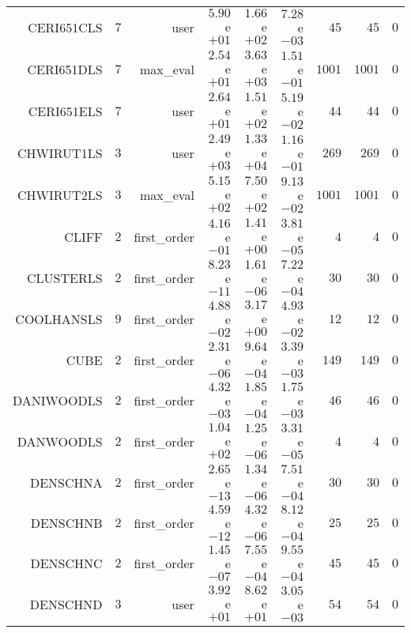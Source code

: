 \begin{longtable}{rrrrrrrrr}
CERI651CLS & \(     7\) & user & \( 5.90\)e\(+01\) & \( 1.66\)e\(+02\) & \( 7.28\)e\(-03\) & \(    45\) & \(    45\) & \(     0\) \\
CERI651DLS & \(     7\) & max\_eval & \( 2.54\)e\(+01\) & \( 3.63\)e\(+03\) & \( 1.51\)e\(-01\) & \(  1001\) & \(  1001\) & \(     0\) \\
CERI651ELS & \(     7\) & user & \( 2.64\)e\(+01\) & \( 1.51\)e\(+02\) & \( 5.19\)e\(-02\) & \(    44\) & \(    44\) & \(     0\) \\
CHWIRUT1LS & \(     3\) & user & \( 2.49\)e\(+03\) & \( 1.33\)e\(+04\) & \( 1.16\)e\(-01\) & \(   269\) & \(   269\) & \(     0\) \\
CHWIRUT2LS & \(     3\) & max\_eval & \( 5.15\)e\(+02\) & \( 7.50\)e\(+02\) & \( 9.13\)e\(-02\) & \(  1001\) & \(  1001\) & \(     0\) \\
CLIFF & \(     2\) & first\_order & \( 4.16\)e\(-01\) & \( 1.41\)e\(+00\) & \( 3.81\)e\(-05\) & \(     4\) & \(     4\) & \(     0\) \\
CLUSTERLS & \(     2\) & first\_order & \( 8.23\)e\(-11\) & \( 1.61\)e\(-06\) & \( 7.22\)e\(-04\) & \(    30\) & \(    30\) & \(     0\) \\
COOLHANSLS & \(     9\) & first\_order & \( 4.88\)e\(-02\) & \( 3.17\)e\(+00\) & \( 4.93\)e\(-02\) & \(    12\) & \(    12\) & \(     0\) \\
CUBE & \(     2\) & first\_order & \( 2.31\)e\(-06\) & \( 9.64\)e\(-04\) & \( 3.39\)e\(-03\) & \(   149\) & \(   149\) & \(     0\) \\
DANIWOODLS & \(     2\) & first\_order & \( 4.32\)e\(-03\) & \( 1.85\)e\(-04\) & \( 1.75\)e\(-03\) & \(    46\) & \(    46\) & \(     0\) \\
DANWOODLS & \(     2\) & first\_order & \( 1.04\)e\(+02\) & \( 1.25\)e\(-06\) & \( 3.31\)e\(-05\) & \(     4\) & \(     4\) & \(     0\) \\
DENSCHNA & \(     2\) & first\_order & \( 2.65\)e\(-13\) & \( 1.34\)e\(-06\) & \( 7.51\)e\(-04\) & \(    30\) & \(    30\) & \(     0\) \\
DENSCHNB & \(     2\) & first\_order & \( 4.59\)e\(-12\) & \( 4.32\)e\(-06\) & \( 8.12\)e\(-04\) & \(    25\) & \(    25\) & \(     0\) \\
DENSCHNC & \(     2\) & first\_order & \( 1.45\)e\(-07\) & \( 7.55\)e\(-04\) & \( 9.55\)e\(-04\) & \(    45\) & \(    45\) & \(     0\) \\
DENSCHND & \(     3\) & user & \( 3.92\)e\(+01\) & \( 8.62\)e\(+01\) & \( 3.05\)e\(-03\) & \(    54\) & \(    54\) & \(     0\) \\

\end{longtable}
